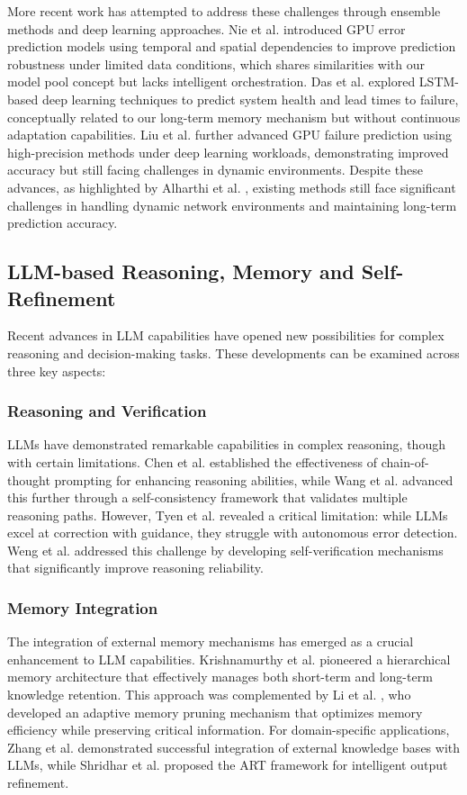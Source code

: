 \documentclass[conference]{IEEEtran}
\begin{document}
More recent work has attempted to address these challenges through ensemble methods and deep learning approaches. Nie et al. \cite{b10} introduced GPU error prediction models using temporal and spatial dependencies to improve prediction robustness under limited data conditions, which shares similarities with our model pool concept but lacks intelligent orchestration. Das et al. \cite{b5} explored LSTM-based deep learning techniques to predict system health and lead times to failure, conceptually related to our long-term memory mechanism but without continuous adaptation capabilities. Liu et al. \cite{b8} further advanced GPU failure prediction using high-precision methods under deep learning workloads, demonstrating improved accuracy but still facing challenges in dynamic environments. Despite these advances, as highlighted by Alharthi et al. \cite{b2}, existing methods still face significant challenges in handling dynamic network environments and maintaining long-term prediction accuracy.

\subsection{LLM-based Reasoning, Memory and Self-Refinement}
Recent advances in LLM capabilities have opened new possibilities for complex reasoning and decision-making tasks. These developments can be examined across three key aspects:

\subsubsection{Reasoning and Verification}
LLMs have demonstrated remarkable capabilities in complex reasoning, though with certain limitations. Chen et al. \cite{chen2023} established the effectiveness of chain-of-thought prompting for enhancing reasoning abilities, while Wang et al. \cite{wang2023} advanced this further through a self-consistency framework that validates multiple reasoning paths. However, Tyen et al. \cite{tyen2023} revealed a critical limitation: while LLMs excel at correction with guidance, they struggle with autonomous error detection. Weng et al. \cite{weng2023} addressed this challenge by developing self-verification mechanisms that significantly improve reasoning reliability.

\subsubsection{Memory Integration}
The integration of external memory mechanisms has emerged as a crucial enhancement to LLM capabilities. Krishnamurthy et al. \cite{krishnamurthy2023} pioneered a hierarchical memory architecture that effectively manages both short-term and long-term knowledge retention. This approach was complemented by Li et al. \cite{li2023}, who developed an adaptive memory pruning mechanism that optimizes memory efficiency while preserving critical information. For domain-specific applications, Zhang et al. \cite{zhang2023} demonstrated successful integration of external knowledge bases with LLMs, while Shridhar et al. \cite{shridhar2023} proposed the ART framework for intelligent output refinement.
\end{document}
